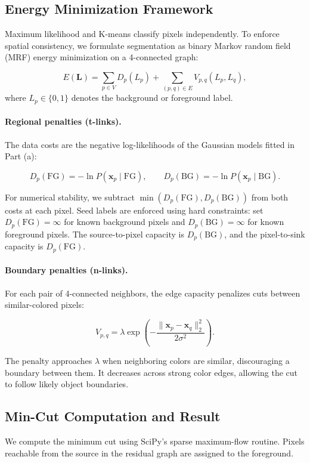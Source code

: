 \documentclass[11pt,a4paper]{article}
\begin{document}
\subsection{Energy Minimization Framework}

Maximum likelihood and K-means classify pixels independently. To enforce spatial consistency, we formulate segmentation as binary Markov random field (MRF) energy minimization on a 4-connected graph:

\[
E(\mathbf{L})=
\sum_{p\in V}D_p(L_p)+
\sum_{(p,q)\in E}V_{p,q}(L_p,L_q),
\]
where $L_p\in\{0,1\}$ denotes the background or foreground label.

\paragraph{Regional penalties (t-links).}
The data costs are the negative log-likelihoods of the Gaussian models fitted in Part (a):

\[
D_p(\mathrm{FG})=-\ln P(\mathbf{x}_p\mid\mathrm{FG}),
\qquad
D_p(\mathrm{BG})=-\ln P(\mathbf{x}_p\mid\mathrm{BG}).
\]

For numerical stability, we subtract
$\min(D_p(\mathrm{FG}),D_p(\mathrm{BG}))$ from both costs at each pixel. Seed labels are enforced using hard constraints: set $D_p(\mathrm{FG})=\infty$ for known background pixels and $D_p(\mathrm{BG})=\infty$ for known foreground pixels. The source-to-pixel capacity is $D_p(\mathrm{BG})$, and the pixel-to-sink capacity is $D_p(\mathrm{FG})$.

\paragraph{Boundary penalties (n-links).}
For each pair of 4-connected neighbors, the edge capacity penalizes cuts between similar-colored pixels:

\[
V_{p,q}=
\lambda\exp\left(
-\frac{\|\mathbf{x}_p-\mathbf{x}_q\|_2^2}{2\sigma^2}
\right).
\]

The penalty approaches $\lambda$ when neighboring colors are similar, discouraging a boundary between them. It decreases across strong color edges, allowing the cut to follow likely object boundaries.

\subsection{Min-Cut Computation and Result}

We compute the minimum cut using SciPy's sparse maximum-flow routine. Pixels reachable from the source in the residual graph are assigned to the foreground.
\end{document}
